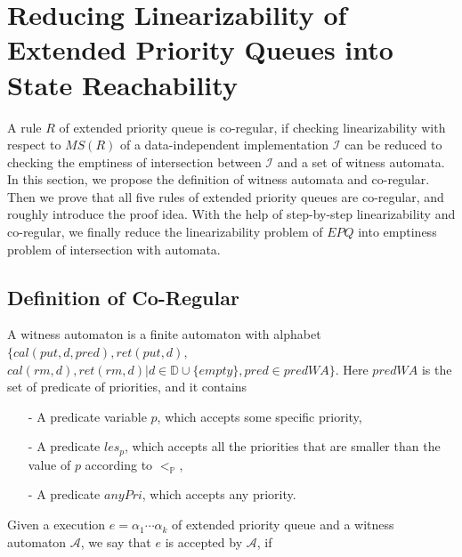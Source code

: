 \section{Reducing Linearizability of Extended Priority Queues into State Reachability}
\label{sec:co-regular of extended priority queues}

A rule $R$ of extended priority queue is co-regular, if checking linearizability with respect to $\textit{MS}(R)$ of a data-independent implementation $\mathcal{I}$ can be reduced to checking the emptiness of intersection between $\mathcal{I}$ and a set of witness automata. In this section, we propose the definition of witness automata and co-regular. Then we prove that all five rules of extended priority queues are co-regular, and roughly introduce the proof idea. With the help of step-by-step linearizability and co-regular, we finally reduce the linearizability problem of $\textit{EPQ}$ into emptiness problem of intersection with automata.



\subsection{Definition of Co-Regular}
\label{subsec:definition of co-regular}

A witness automaton is a finite automaton with alphabet $\{ \textit{cal}(\textit{put},d,\textit{pred}), \textit{ret}(\textit{put},d),$ $\textit{cal}(\textit{rm},d),\textit{ret}(\textit{rm},d) \vert d \in \mathbb{D} \cup \{ \textit{empty} \},\textit{pred} \in \textit{predWA} \}$. Here $\textit{predWA}$ is the set of predicate of priorities, and it contains

\begin{itemize}
\setlength{\itemsep}{0.5pt}
\item[-] A predicate variable $p$, which accepts some specific priority,

\item[-] A predicate $\textit{les}_p$, which accepts all the priorities that are smaller than the value of $p$ according to $<_{\mathbb{P}}$,

\item[-] A predicate $\textit{anyPri}$, which accepts any priority.
\end{itemize}

Given a execution $e = \alpha_1 \cdots \alpha_k$ of extended priority queue and a witness automaton $\mathcal{A}$, we say that $e$ is accepted by $\mathcal{A}$, if


